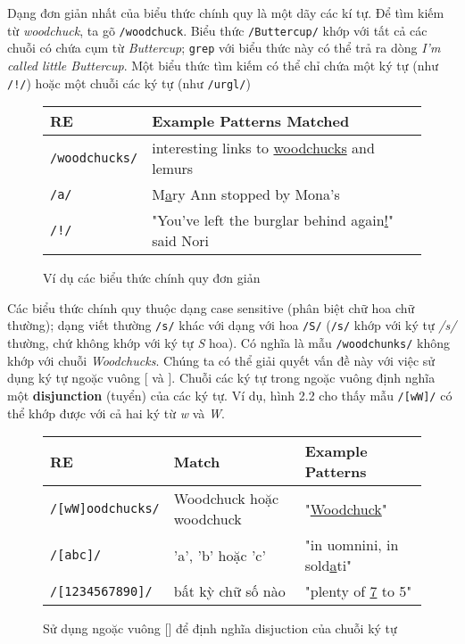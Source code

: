 Dạng đơn giản nhất của biểu thức chính quy là một dãy các kí tự. Để tìm kiếm từ \textit{woodchuck}, ta gõ \verb|/woodchuck|. Biểu thức \verb|/Buttercup/| khớp với tất cả các chuỗi có chứa cụm từ \textit{Buttercup}; \verb|grep| với biểu thức này có thể trả ra dòng \textit{I'm called little Buttercup}. Một biểu thức tìm kiếm có thể chỉ chứa một ký tự (như \verb|/!/|) hoặc một chuỗi các ký tự (như \verb|/urgl/|)

\begin{figure}[h]
	\begin{tabular}{ l l }
	 \hline
	 RE & Example Patterns Matched \\
	 \hline
	 \verb|/woodchucks/| & interesting links to \underline{woodchucks} and lemurs \\
	 \verb|/a/| & M\underline{a}ry Ann stopped by Mona's  \\
	 \verb|/!/| & "You've left the burglar behind again\underline{!}" said Nori \\
	 \hline
	\end{tabular}
 \caption{Ví dụ các biểu thức chính quy đơn giản}
 \label{table:1}
\end{figure}

Các biểu thức chính quy thuộc dạng case sensitive (phân biệt chữ hoa chữ thường); dạng viết thường \verb|/s/| khác với dạng với hoa \verb|/S/| (\verb|/s/| khớp với ký tự \textit{/s/} thường, chứ không khớp với ký tự \textit{S} hoa). Có nghĩa là mẫu \verb|/woodchunks/| không khớp với chuỗi \textit{Woodchucks}. Chúng ta có thể giải quyết vấn đề này với việc sử dụng ký tự ngoặc vuông [ và ]. Chuỗi các ký tự trong ngoặc vuông định nghĩa một \textbf{disjunction} (tuyển) của các ký tự. Ví dụ, hình 2.2 cho thấy mẫu \verb|/[wW]/| có thể khớp được với cả hai ký từ \textit{w} và \textit{W}.

\begin{figure}[h]
	\begin{tabular}{ l l l }
	 \hline
	 RE & Match & Example Patterns \\
	 \hline
	 \verb|/[wW]oodchucks/| & Woodchuck hoặc woodchuck & "\underline{Woodchuck}" \\
	 \verb|/[abc]/| & 'a', 'b' hoặc 'c' & "in uomnini, in sold\underline{a}ti" \\
	 \verb|/[1234567890]/| & bất kỳ chữ số nào & "plenty of \underline{7} to 5" \\
	 \hline
	\end{tabular}
 \caption{Sử dụng ngoặc vuông [] để định nghĩa disjuction của chuỗi ký tự}
 \label{table:2}
\end{figure}

